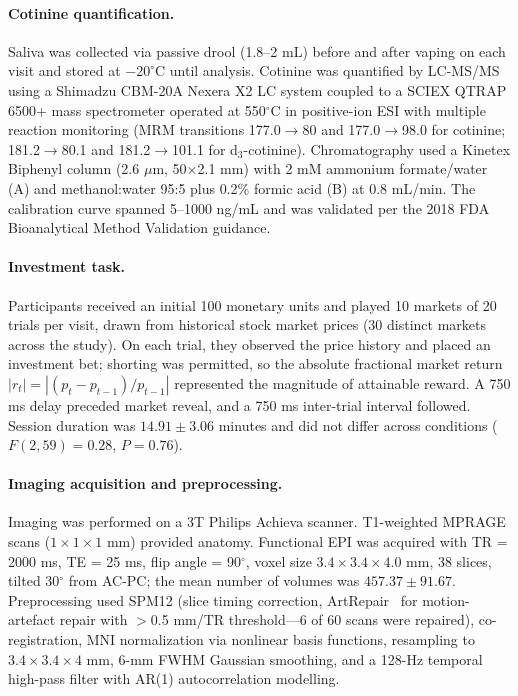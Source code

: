 \documentclass[11pt]{article}
\begin{document}
\paragraph{Cotinine quantification.} Saliva was collected via passive drool (1.8--2 mL) before and after vaping on each visit and stored at $-20^\circ$C until analysis. Cotinine was quantified by LC-MS/MS using a Shimadzu CBM-20A Nexera X2 LC system coupled to a SCIEX QTRAP 6500+ mass spectrometer operated at 550$^\circ$C in positive-ion ESI with multiple reaction monitoring (MRM transitions 177.0$\to$80 and 177.0$\to$98.0 for cotinine; 181.2$\to$80.1 and 181.2$\to$101.1 for d$_3$-cotinine). Chromatography used a Kinetex Biphenyl column (2.6 $\mu$m, 50$\times$2.1 mm) with 2 mM ammonium formate/water (A) and methanol:water 95:5 plus 0.2\% formic acid (B) at 0.8 mL/min. The calibration curve spanned 5--1000 ng/mL and was validated per the 2018 FDA Bioanalytical Method Validation guidance.

\paragraph{Investment task.} Participants received an initial 100 monetary units and played 10 markets of 20 trials per visit, drawn from historical stock market prices (30 distinct markets across the study). On each trial, they observed the price history and placed an investment bet; shorting was permitted, so the absolute fractional market return $|r_t| = |(p_t - p_{t-1})/p_{t-1}|$ represented the magnitude of attainable reward. A 750 ms delay preceded market reveal, and a 750 ms inter-trial interval followed. Session duration was $14.91 \pm 3.06$ minutes and did not differ across conditions ($F(2,59)=0.28$, $P=0.76$).

\paragraph{Imaging acquisition and preprocessing.} Imaging was performed on a 3T Philips Achieva scanner. T1-weighted MPRAGE scans ($1 \times 1 \times 1$ mm) provided anatomy. Functional EPI was acquired with TR = 2000 ms, TE = 25 ms, flip angle = 90$^\circ$, voxel size $3.4 \times 3.4 \times 4.0$ mm, 38 slices, tilted 30$^\circ$ from AC-PC; the mean number of volumes was $457.37 \pm 91.67$. Preprocessing used SPM12 (slice timing correction, ArtRepair~\cite{mazaika2009artifact} for motion-artefact repair with $>$0.5 mm/TR threshold---6 of 60 scans were repaired), co-registration, MNI normalization via nonlinear basis functions, resampling to $3.4 \times 3.4 \times 4$ mm, 6-mm FWHM Gaussian smoothing, and a 128-Hz temporal high-pass filter with AR(1) autocorrelation modelling.
\end{document}
